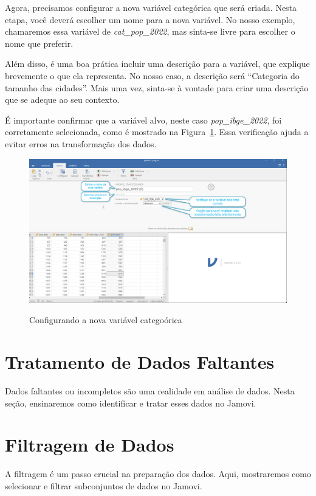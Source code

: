 Agora, precisamos configurar a nova variável categórica que será criada. Nesta etapa, você deverá escolher um nome para a nova variável. No nosso exemplo, chamaremos essa variável de \textit{cat\_pop\_2022}, mas sinta-se livre para escolher o nome que preferir. 

Além disso, é uma boa prática incluir uma descrição para a variável, que explique brevemente o que ela representa. No nosso caso, a descrição será ``Categoria do tamanho das cidades''. Mais uma vez, sinta-se à vontade para criar uma descrição que se adeque ao seu contexto.

É importante confirmar que a variável alvo, neste caso \textit{pop\_ibge\_2022}, foi corretamente selecionada, como é mostrado na Figura~\ref{fig:criar_categoria_jamovi_2}. Essa verificação ajuda a evitar erros na transformação dos dados.

\begin{figure}[H]
    \centering
    \caption{Configurando a nova variável categoórica}
    \includegraphics[width=\textwidth]{imagens/cap_2/criar_categoria_jamovi_2.png}
    \label{fig:criar_categoria_jamovi_2}
\end{figure}


\section{Tratamento de Dados Faltantes}
Dados faltantes ou incompletos são uma realidade em análise de dados. Nesta seção, ensinaremos como identificar e tratar esses dados no Jamovi.

\section{Filtragem de Dados}
A filtragem é um passo crucial na preparação dos dados. Aqui, mostraremos como selecionar e filtrar subconjuntos de dados no Jamovi.

